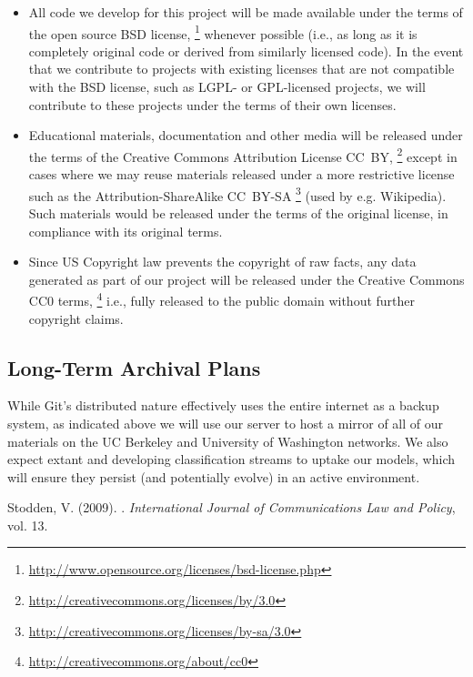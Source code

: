 \documentclass[11pt]{article}
\begin{document}
\begin{itemize}

\item All code we develop for this project will be made available under the
terms of the open source BSD license,
\footnote{\url{http://www.opensource.org/licenses/bsd-license.php} } whenever
possible (i.e., as long as it is completely original code or derived from
similarly licensed code).  In the event that we contribute to projects with
existing licenses that are not compatible with the BSD license, such as LGPL- or
GPL-licensed projects, we will contribute to these projects under the terms of
their own licenses.

\item Educational materials, documentation and other media will be released
under the terms of the Creative Commons Attribution License CC~BY,
\footnote{\url{http://creativecommons.org/licenses/by/3.0} } except in cases
where we may reuse materials released under a more restrictive license such as
the Attribution-ShareAlike CC~BY-SA
\footnote{\url{http://creativecommons.org/licenses/by-sa/3.0} } (used by e.g.
Wikipedia). Such materials would be released under the terms of the original
license, in compliance with its original terms.

\item Since US Copyright law prevents the copyright of raw facts, any data
generated as part of our project will be released under the Creative Commons CC0
terms, \footnote{\url{http://creativecommons.org/about/cc0} } i.e., fully
released to the public domain without further copyright claims.

\end{itemize}

\subsection*{Long-Term Archival Plans}

While Git's distributed nature effectively uses the entire internet as a backup
system, as indicated above we will use our server to host a mirror of all of our
materials on the UC Berkeley and University of Washington networks.  We also
expect extant and developing classification streams to uptake our models, which
will ensure they persist (and potentially evolve) in an active environment.

\begin{thebibliography}{99}

 Stodden, V. (2009). . \newblock
{\textit{International Journal of Communications Law and Policy}, vol. 13}.

\end{thebibliography}
\end{document}
